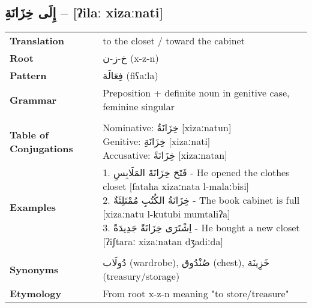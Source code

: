 \documentclass[letter,12pt]{article}
\begin{document}
\subsection{\textarabic{إِلَى خِزَانَةِ} – [ʔilaː xizaːnati]}
\begin{tabular}{p{3cm}p{10cm}}
\toprule
\textbf{Translation} & to the closet / toward the cabinet \\
\textbf{Root} & \textarabic{خ-ز-ن} (x-z-n) \\
\textbf{Pattern} & \textarabic{فِعَالَة} (fiʕaːla) \\
\textbf{Grammar} & Preposition + definite noun in genitive case, feminine singular \\
\midrule \\
\textbf{Table of Conjugations} & \makecell[l]{
Nominative: \textarabic{خِزَانَةٌ} [xizaːnatun] \\
Genitive: \textarabic{خِزَانَةِ} [xizaːnati] \\
Accusative: \textarabic{خِزَانَةً} [xizaːnatan]
} \\
\midrule
\textbf{Examples} & \makecell[l]{\parbox{9.5cm}{
1. \textarabic{فَتَحَ خِزَانَةَ المَلَابِسِ} - He opened the clothes closet [fataħa xizaːnata l-malaːbisi]\\
2. \textarabic{خِزَانَةُ الكُتُبِ مُمْتَلِئَةٌ} - The book cabinet is full [xizaːnatu l-kutubi mumtaliʔa]\\
3. \textarabic{اِشْتَرَى خِزَانَةً جَدِيدَةً} - He bought a new closet [ʔiʃtaraː xizaːnatan dʒadiːda]
}} \\
\midrule \\
\textbf{Synonyms} & \textarabic{دُولَاب} (wardrobe), \textarabic{صُنْدُوق} (chest), \textarabic{خَزِينَة} (treasury/storage) \\
\textbf{Etymology} & From root x-z-n meaning "to store/treasure" \\
\bottomrule
\end{tabular}
\end{document}
